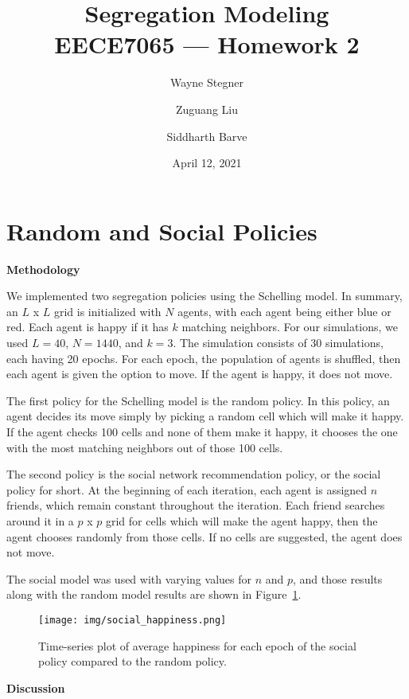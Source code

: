 \documentclass[12pt, titlepage]{article}
\title{%
	Segregation Modeling \\
	\large EECE7065 --- Homework 2
}
\author{%
	Wayne Stegner
	\and
	Zuguang Liu
	\and
	Siddharth Barve
}
\date{April 12, 2021}
\newcommand{\figref}[1]{Figure~\ref{#1}}
\begin{document}
	\maketitle

	\section{Random and Social Policies}
	\vspace{-12pt}
	\par \textbf{Methodology}
	\par We implemented two segregation policies using the Schelling model.
	In summary, an $L$ x $L$ grid is initialized with $N$ agents, with each
	agent being either blue or red.
	Each agent is happy if it has $k$ matching neighbors.
	For our simulations, we used $L = 40$, $N = 1440$, and $k = 3$.
	The simulation consists of 30 simulations, each having 20 epochs.
	For each epoch, the population of agents is shuffled, then each agent is given
	the option to move.
	If the agent is happy, it does not move.
	\par The first policy for the Schelling model is the random policy.
	In this policy, an agent decides its move simply by picking a random cell
	which will make it happy.
	If the agent checks 100 cells and none of them make it happy, it chooses the
	one with the most matching neighbors out of those 100 cells.
	\par The second policy is the social network recommendation policy, or the
	social policy for short.
	At the beginning of each iteration, each agent is assigned $n$ friends, which
	remain constant throughout the iteration.
	Each friend searches around it in a $p$ x $p$ grid for cells which will make
	the agent happy, then the agent chooses randomly from those cells.
	If no cells are suggested, the agent does not move.
	\par The social model was used with varying values for $n$ and $p$, and those
	results along with the random model results are shown in
	\figref{fig:social_happiness}.
	\vspace{-12pt}
	\begin{figure}[htb]
		\centering
		\texttt{[image: img/social\_happiness.png]}
		\caption{Time-series plot of average happiness for each epoch of the social
			policy compared to the random policy.}%
		\label{fig:social_happiness}
	\end{figure}
	\vspace{-12pt}
	\par \textbf{Discussion}
\end{document}
